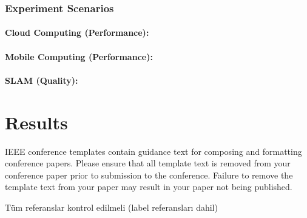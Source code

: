 \documentclass[conference]{IEEEtran}
\begin{document}
\subsubsection{Experiment Scenarios}
\paragraph{Cloud Computing (Performance):}
\paragraph{Mobile Computing (Performance):}
\paragraph{SLAM (Quality):}


\section{Results}



\vspace{12pt}
\color{red}
IEEE conference templates contain guidance text for composing and formatting conference papers. Please ensure that all template text is removed from your conference paper prior to submission to the conference. Failure to remove the template text from your paper may result in your paper not being published.

\vspace{12pt}
\color{red}
Tüm referanslar kontrol edilmeli (label referansları dahil)
\end{document}
